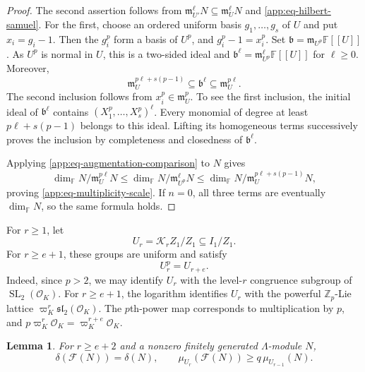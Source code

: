 \documentclass[11pt]{article}
\numberwithin{equation}{section}
\newtheorem{lemma}[theorem]{Lemma}
\theoremstyle{definition}
\theoremstyle{remark}
\newcommand{\F}{\mathbb F}
\newcommand{\Z}{\mathbb Z}
\newcommand{\cO}{\mathcal O}
\newcommand{\fm}{\mathfrak m}
\DeclareMathOperator{\SL}{SL}
\begin{document}
\begin{cbunit}
\begin{proof}
The second assertion follows from
$\fm_{U'}^\ell N\subseteq\fm_U^\ell N$ and
\eqref{app:eq-hilbert-samuel}. For the first, choose an ordered
uniform basis $g_1,\ldots,g_s$ of $U$ and put $x_i=g_i-1$.
Then the $g_i^p$ form a basis of $U^p$, and $g_i^p-1=x_i^p$.
Set $\mathfrak b=\fm_{U^p}\F[[U]]$.
As $U^p$ is normal in $U$, this is a two-sided ideal and
$\mathfrak b^\ell=\fm_{U^p}^{\ell}\F[[U]]$ for $\ell\geq0$.
Moreover,
\begin{equation}\label{app:eq-augmentation-comparison}
 \fm_U^{p\ell+s(p-1)}\subseteq\mathfrak b^\ell
       \subseteq\fm_U^{p\ell}.
\end{equation}
The second inclusion follows from $x_i^p\in\fm_U^p$.
To see the first inclusion, the initial ideal of $\mathfrak b^\ell$
contains $(X_1^p,\ldots,X_s^p)^\ell$. Every monomial of degree
at least $p\ell+s(p-1)$ belongs to this ideal. Lifting its
homogeneous terms successively proves the inclusion by
completeness and closedness of $\mathfrak b^\ell$.

Applying \eqref{app:eq-augmentation-comparison} to $N$ gives
\[
 \dim_{\F}N/\fm_U^{p\ell}N
 \leq\dim_{\F}N/\fm_{U^p}^{\ell}N
 \leq\dim_{\F}N/\fm_U^{p\ell+s(p-1)}N,
\]
proving \eqref{app:eq-multiplicity-scale}. If $n=0$, all three
terms are eventually $\dim_{\F}N$, so the same formula holds.
\end{proof}

For $r\geq1$, let
\[
 U_r=\mathcal K_rZ_1/Z_1\subseteq I_1/Z_1.
\]
For $r\geq e+1$, these groups are uniform and satisfy
\begin{equation}\label{app:eq-congruence-powers}
 U_r^p=U_{r+e}.
\end{equation}
Indeed, since $p>2$, we may identify $U_r$ with the level-$r$
congruence subgroup of $\SL_2(\cO_K)$. For $r\geq e+1$,
the logarithm identifies $U_r$ with the powerful $\Z_p$-Lie lattice
$\varpi_K^r\mathfrak{sl}_2(\cO_K)$. The $p$th-power map
corresponds to multiplication by $p$, and
$p\varpi_K^r\cO_K=\varpi_K^{r+e}\cO_K$.

\begin{lemma}\label{app:lem-multiplicity-recurrence}
For $r\geq e+2$ and a nonzero finitely generated
$\Lambda$-module $N$,
\[
 \delta(\mathcal F(N))=\delta(N),\qquad
 \mu_{U_r}(\mathcal F(N))\geq q\,\mu_{U_{r-1}}(N).
\]
\end{lemma}


\end{cbunit}
\end{document}
